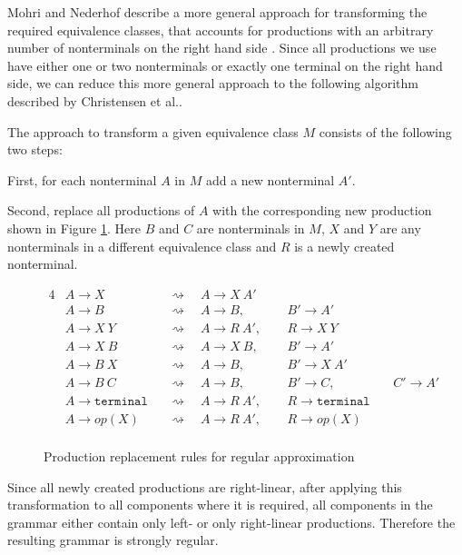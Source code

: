 Mohri and Nederhof describe a more general approach for transforming the required equivalence classes, that accounts for productions with an arbitrary number of nonterminals on the right hand side \cite{mohri_nederhof}. Since all productions we use have either one or two nonterminals or exactly one terminal on the right hand side, we can reduce this more general approach to the following algorithm described by Christensen et al.\cite{brics}.

The approach to transform a given equivalence class $M$ consists of the following two steps:

First, for each nonterminal $A$ in $M$ add a new nonterminal $A'$.

Second, replace all productions of $A$ with the corresponding new production shown in Figure \ref{fig:approx:prodreplacement}. Here $B$ and $C$ are nonterminals in $M$, $X$ and $Y$ are any nonterminals in a different equivalence class and $R$ is a newly created nonterminal.

\begin{figure}[!h]
	\begin{alignat*}{4}
		& A \rightarrow X 	 && \rightsquigarrow \quad A \rightarrow X\ A'\ \  & &\\
		& A \rightarrow B 	 && \rightsquigarrow \quad A \rightarrow B,\ \ 	   & &B' \rightarrow A'\ &&\\
		& A \rightarrow X\ Y && \rightsquigarrow \quad A \rightarrow R\ A',\ \ & &R  \rightarrow X\ Y\ &&\\
		& A \rightarrow X\ B && \rightsquigarrow \quad A \rightarrow X\ B,\ \  & &B' \rightarrow A'\ &&\\
		& A \rightarrow B\ X && \rightsquigarrow \quad A \rightarrow B,\ \ 	   & &B' \rightarrow X\ A'\ &&\\
		& A \rightarrow B\ C && \rightsquigarrow \quad A \rightarrow B,\ \     & &B' \rightarrow C,\ &&C' \rightarrow A'\\
		& A \rightarrow \texttt{terminal} && \rightsquigarrow \quad A \rightarrow R\ A',\ \ & &R \rightarrow \texttt{terminal}\ &&\\
		& A \rightarrow op(X) && \rightsquigarrow  \quad A \rightarrow R\ A',\ \ & &R \rightarrow op(X)\ &&\\
	\end{alignat*}
\caption{Production replacement rules for regular approximation}
\label{fig:approx:prodreplacement}
\end{figure}
Since all newly created productions are right-linear, after applying this transformation to all components where it is required, all components in the grammar either contain only left- or only right-linear productions. Therefore the resulting grammar is strongly regular.

